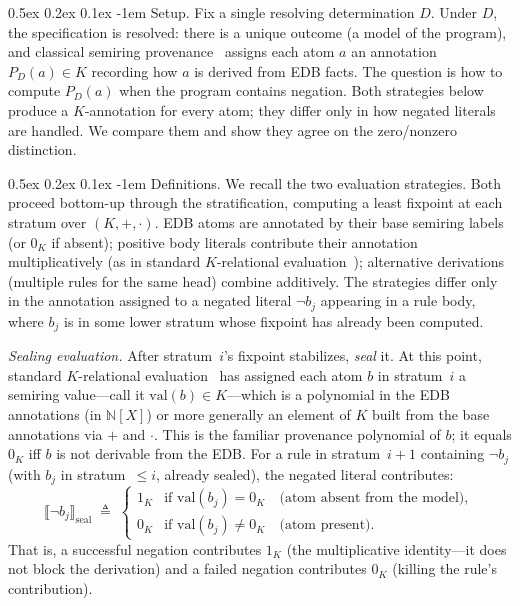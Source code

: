 \documentclass[acmsmall,review,anonymous]{acmart}
\makeatletter
\renewcommand{\paragraph}{\@startsection{paragraph}{4}{\z@}%
  {0.5ex \@plus 0.2ex \@minus 0.1ex}%
  {-1em}%
  {\normalfont\normalsize\bfseries}}
\theoremstyle{remark}
\numberwithin{definition}{section}
\numberwithin{theorem}{section}
\numberwithin{lemma}{section}
\numberwithin{corollary}{section}
\numberwithin{remark}{section}
\numberwithin{example}{section}
\numberwithin{observation}{section}
\numberwithin{assumption}{section}
\makeatother
\begin{document}
\paragraph{Setup.}
Fix a single resolving determination $D$.
Under $D$, the specification is resolved: there is a unique outcome
(a model of the program), and classical semiring
provenance~\cite{green2007provenance} assigns each atom $a$ an
annotation $P_D(a) \in K$ recording how $a$ is derived from EDB facts.
The question is how to compute $P_D(a)$ when the program contains
negation.
Both strategies below produce a $K$-annotation for every atom; they
differ only in how negated literals are handled.
We compare them and show they agree on the zero/nonzero distinction.

\paragraph{Definitions.}
We recall the two evaluation strategies.
Both proceed bottom-up through the stratification, computing a least
fixpoint at each stratum over $(K, +, \cdot)$.
EDB atoms are annotated by their base semiring labels (or $0_K$ if
absent); positive body literals contribute their annotation
multiplicatively (as in standard $K$-relational
evaluation~\cite{green2007provenance}); alternative derivations
(multiple rules for the same head) combine additively.
The strategies differ only in the annotation assigned to a negated
literal $\neg b_j$ appearing in a rule body, where $b_j$ is in some
lower stratum whose fixpoint has already been computed.

\emph{Sealing evaluation.}
After stratum~$i$'s fixpoint stabilizes, \emph{seal} it.
At this point, standard $K$-relational
evaluation~\cite{green2007provenance} has assigned each atom $b$ in
stratum~$i$ a semiring value---call it $\mathrm{val}(b) \in K$---which
is a polynomial in the EDB annotations (in $\mathbb{N}[X]$) or more
generally an element of $K$ built from the base annotations via $+$
and $\cdot$.
This is the familiar provenance polynomial of $b$; it equals $0_K$
iff $b$ is not derivable from the EDB.
For a rule in stratum~$i{+}1$ containing $\neg b_j$ (with $b_j$ in
stratum~$\le i$, already sealed), the negated literal contributes:
\[
  \llbracket \neg b_j \rrbracket_{\mathrm{seal}}
  \;\triangleq\;
  \begin{cases}
    1_K & \text{if } \mathrm{val}(b_j) = 0_K
          \quad\text{(atom absent from the model)}, \\
    0_K & \text{if } \mathrm{val}(b_j) \neq 0_K
          \quad\text{(atom present)}.
  \end{cases}
\]
That is, a successful negation contributes $1_K$ (the multiplicative
identity---it does not block the derivation) and a failed negation
contributes $0_K$ (killing the rule's contribution).
\end{document}
